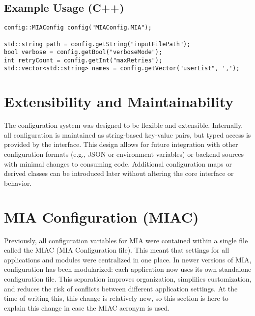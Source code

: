 \subsection*{Example Usage (C++)}

\begin{lstlisting}[style=cppstyle]
config::MIAConfig config("MIAConfig.MIA");

std::string path = config.getString("inputFilePath");
bool verbose = config.getBool("verboseMode");
int retryCount = config.getInt("maxRetries");
std::vector<std::string> names = config.getVector("userList", ',');
\end{lstlisting}

\section{Extensibility and Maintainability}

The configuration system was designed to be flexible and extensible. Internally, all configuration is maintained as string-based key-value pairs, but typed access is provided by the interface. This design allows for future integration with other configuration formats (e.g., JSON or environment variables) or backend sources with minimal changes to consuming code. Additional configuration maps or derived classes can be introduced later without altering the core interface or behavior.

\section{MIA Configuration (MIAC)}

Previously, all configuration variables for MIA were contained within a single file called the MIAC (MIA Configuration file). This meant that settings for all applications and modules were centralized in one place. In newer versions of MIA, configuration has been modularized: each application now uses its own standalone configuration file. This separation improves organization, simplifies customization, and reduces the risk of conflicts between different application settings. At the time of writing this, this change is relatively new, so this section is here to explain this change in case the MIAC acronym is used.
